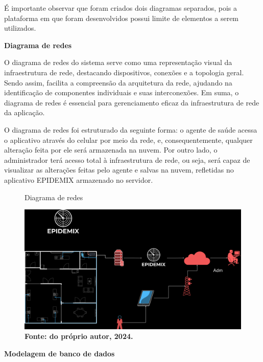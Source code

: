 \vspace{12pt}

É importante observar que foram criados dois diagramas separados, pois a plataforma em que foram desenvolvidos possui limite de elementos a serem utilizados. 

\vspace{12pt}

\textbf{Diagrama de redes}\newline

O diagrama de redes do sistema serve como uma representação visual da infraestrutura de rede, destacando dispositivos, conexões e a topologia geral. Sendo assim, facilita a compreensão da arquitetura da rede, ajudando na identificação de componentes individuais e suas interconexões. Em suma, o diagrama de redes é essencial para gerenciamento eficaz da infraestrutura de rede da aplicação. 

O diagrama de redes foi estruturado da seguinte forma: o agente de saúde acessa o aplicativo através do celular por meio da rede, e, consequentemente, qualquer alteração feita por ele será armazenada na nuvem. Por outro lado, o administrador terá acesso total à infraestrutura de rede, ou seja, será capaz de visualizar as alterações feitas pelo agente e salvas na nuvem, refletidas no aplicativo EPIDEMIX armazenado no servidor.

\begin{figure}[H]
    \centering
    \caption{Diagrama de redes}
    \includegraphics[width=1.0\linewidth]{Illustrations/redes.png}
    \caption*{\textbf{Fonte: do próprio autor, 2024.}}
\end{figure}

\vspace{12pt}

\textbf{Modelagem de banco de dados}\newline


